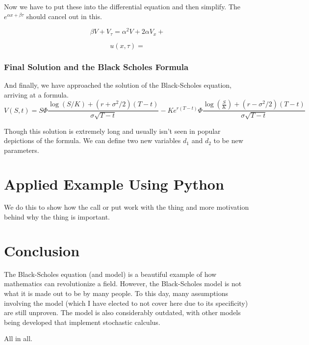 \documentclass{article}
\begin{document}
Now we have to put these into the differential equation and then simplify. The $e^{\alpha x + \beta \tau}$ should cancel out in this. 

\begin{equation}
    \beta V + V_{\tau} = \alpha^2 V + 2\alpha V_{x} + 
\end{equation}



\begin{equation}
    u(x, \tau) = 
\end{equation}

\subsubsection*{Final Solution and the Black Scholes Formula}


And finally, we have approached the solution of the Black-Scholes equation, arriving at a formula. 
\begin{equation}
    V(S,t) = S\Phi \frac{\log{(S/K)} + (r + \sigma^2/2)(T-t)}{\sigma \sqrt{T-t}}
    - Ke^{r(T-t)} \Phi \frac{\log{(\frac{S}{K})} + (r-\sigma^{2}/2)(T-t)}{\sigma \sqrt{T-t}}
\end{equation}

Though this solution is extremely long and usually isn't seen in popular depictions of the formula. 
We can define two new variables $d_1$ and $d_2$ to be new parameters.



\section{Applied Example Using Python}
We do this to show how the call or put work with the thing and more motivation behind why the thing is important.


\section*{Conclusion}

The Black-Scholes equation (and model) is a beautiful example of how mathematics can revolutionize a field. 
However, the Black-Scholes model is not what it is made out to be by many people. To this day, many assumptions involving the model 
(which I have elected to not cover here due to its specificity) are still unproven. The model is also considerably outdated, with other models being developed
that implement stochastic calculus. 

All in all. 
\end{document}
